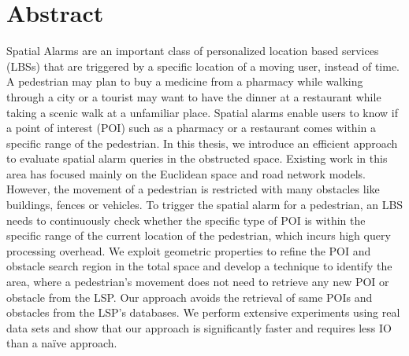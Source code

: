 \chapter*{Abstract}

\hspace{3ex} Spatial Alarms are an important class of personalized location based services (LBSs) that are triggered by a specific location of a moving user, instead of time. A pedestrian may plan to buy a medicine from a pharmacy while walking through a city or a tourist may want to have the dinner at a restaurant while taking a scenic walk at a unfamiliar place. Spatial alarms enable users to know if a point of interest (POI) such as a pharmacy or a restaurant comes within a specific range of the pedestrian. In this thesis, we introduce an efficient approach to evaluate spatial alarm queries in the obstructed space. Existing work in this area has focused mainly on the Euclidean space and road network models. However, the movement of a pedestrian is restricted with many obstacles like buildings, fences or vehicles. To trigger the spatial alarm for a pedestrian, an LBS needs to continuously check whether the specific type of POI is within the specific range of the current location of the pedestrian, which incurs high query processing overhead. We exploit geometric properties to refine the POI and obstacle search region in the total space and develop a technique to identify the area, where a pedestrian’s movement does not need to retrieve any new POI or obstacle from the LSP. Our approach avoids the retrieval of same POIs and obstacles from the LSP’s databases. We perform extensive experiments using real data sets and show that our approach is significantly faster and requires less IO than a naïve approach.



